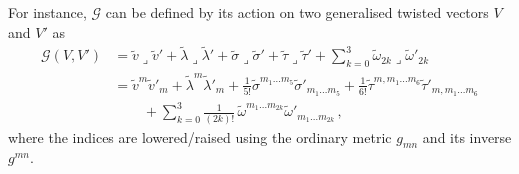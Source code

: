 \documentclass[debug]{phd}
\begin{document}
					For instance, $\mathcal{G}$ can be defined by its action on two generalised twisted vectors $V$ and $V'$ as
							\begin{equation}\label{GofVandV'}
								\begin{split}
									\mathcal{G}(V,V')&= \tilde{v} \lrcorner \tilde{v}' + \tilde{\lambda} \lrcorner \tilde{\lambda}' + \tilde{\sigma} \lrcorner \tilde{\sigma}' + \tilde{\tau} \lrcorner \tilde{\tau}'+ \sum_{k=0}^3\tilde{\omega}_{2k} \lrcorner \tilde{\omega}'_{2k} \\
										&= \tilde{v}^m \tilde{v}'_m + \tilde{\lambda}^m \tilde{\lambda}'_m + \tfrac{1}{5!}\tilde{\sigma}^{m_1\ldots m_5} \tilde{\sigma}'_{m_1\ldots m_5} + \tfrac{1}{6!}\tilde{\tau}^{m,m_1\ldots m_6} \tilde{\tau}'_{m,m_1\ldots m_6} \\
											& \phantom{= +} + \sum_{k=0}^3\tfrac{1}{(2k)!}\,\tilde{\omega}^{m_1 \ldots m_{2k}} \tilde{\omega}'_{m_1 \ldots m_{2k}} \, ,
								\end{split}
							\end{equation}
					where the indices are lowered/raised using the ordinary metric $g_{mn}$ and its inverse $g^{mn}$.
					
\end{document}
